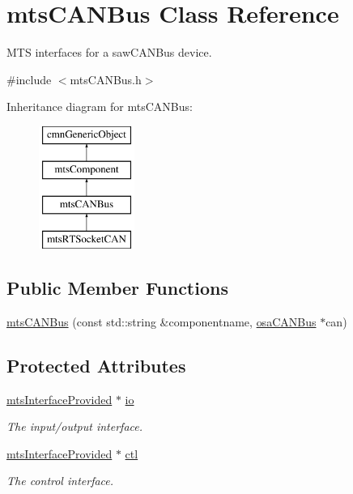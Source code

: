 \hypertarget{classmts_c_a_n_bus}{\section{mts\-C\-A\-N\-Bus Class Reference}
\label{classmts_c_a_n_bus}
}


M\-T\-S interfaces for a saw\-C\-A\-N\-Bus device.  




{\ttfamily \#include $<$mts\-C\-A\-N\-Bus.\-h$>$}

Inheritance diagram for mts\-C\-A\-N\-Bus\-:\begin{figure}[H]
\begin{center}
\leavevmode
\includegraphics[height=4.000000cm]{db/de1/classmts_c_a_n_bus}
\end{center}
\end{figure}
\subsection*{Public Member Functions}
\begin{DoxyCompactItemize}
\item 
\hyperlink{classmts_c_a_n_bus_aee41c73121b347bf181bf51ff0cfa3ae}{mts\-C\-A\-N\-Bus} (const std\-::string \&componentname, \hyperlink{classosa_c_a_n_bus}{osa\-C\-A\-N\-Bus} $\ast$can)
\end{DoxyCompactItemize}
\subsection*{Protected Attributes}
\begin{DoxyCompactItemize}
\item 
\hyperlink{classmts_interface_provided}{mts\-Interface\-Provided} $\ast$ \hyperlink{classmts_c_a_n_bus_a273a160e43d6b59b9f451c7ef8c1f93e}{io}
\begin{DoxyCompactList}\small\item\em The input/output interface. \end{DoxyCompactList}\item 
\hyperlink{classmts_interface_provided}{mts\-Interface\-Provided} $\ast$ \hyperlink{classmts_c_a_n_bus_ae87e117a52479bae3ec4464f2448e8c2}{ctl}
\begin{DoxyCompactList}\small\item\em The control interface. \end{DoxyCompactList}\end{DoxyCompactItemize}
